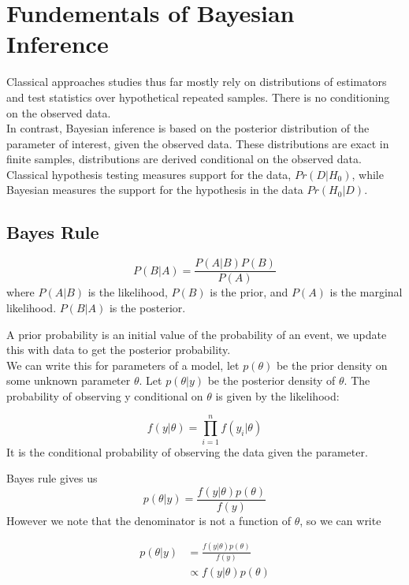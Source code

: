 \documentclass[DIV=14,titlepage=false]{scrreprt}
\begin{document}
\vspace{-10pt}
\setcounter{chapter}{5}


\chapter{Fundementals of Bayesian Inference}
Classical approaches studies thus far mostly rely on distributions of estimators and test statistics over hypothetical repeated samples. There is no conditioning on the observed data.\\
In contrast, Bayesian inference is based on the posterior distribution of the parameter of interest, given the observed data. These distributions are exact in finite samples, distributions are derived conditional on the observed data.\\
Classical hypothesis testing measures support for the data, $Pr(D|H_0)$, while Bayesian measures the support for the hypothesis in the data $Pr(H_0|D)$.
\section{Bayes Rule}
\begin{definition}
    \[
        P(B|A) = \frac{P(A|B)P(B)}{P(A)}
    \]
    where $P(A|B)$ is the likelihood, $P(B)$ is the prior, and $P(A)$ is the marginal likelihood. $P(B|A)$ is the posterior.
\end{definition}
A prior probability is an initial value of the probability of an event, we update this with data to get the posterior probability.\\
We can write this for parameters of a model, let $p(\theta)$ be the prior density on some unknown parameter $\theta$. Let $p(\theta|y)$ be the posterior density of $\theta$. The probability of observing y conditional on $\theta$ is given by the likelihood:
\begin{definition}
    \[
    f(y|\theta)=\prod_{i=1}^n f(y_i|\theta)
\]
It is the conditional probability of observing the data given the parameter.
\end{definition}
Bayes rule gives us
\[
    p(\theta|y) = \frac{f(y|\theta)p(\theta)}{f(y)}
\]
However we note that the denominator is not a function of $\theta$, so we can write
\begin{definition}
    \begin{align*}
        p(\theta|y) &= \frac{f(y|\theta)p(\theta)}{f(y)}\\
        &\propto f(y|\theta)p(\theta)
    \end{align*}
\end{definition}
\end{document}
